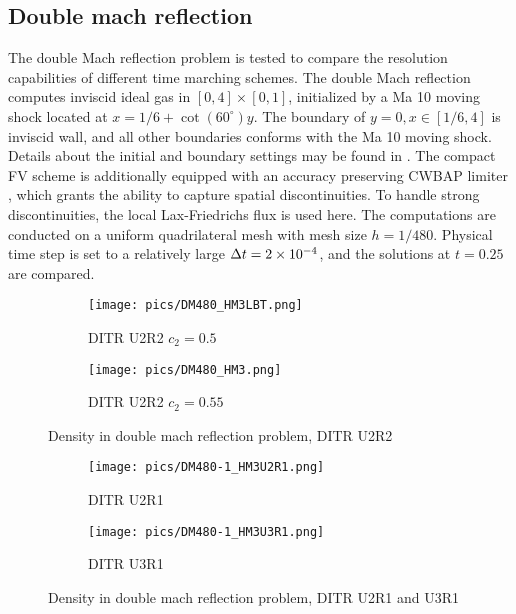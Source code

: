 \documentclass[preprint,12pt]{elsarticle}
\begin{document}
\subsection{Double mach reflection}

The double Mach reflection problem \cite{woodward1984dmr} is tested to
compare the resolution capabilities
of different time marching schemes.
The double Mach reflection computes
inviscid ideal gas in $[0,4]\times[0,1]$,
initialized by a Ma 10 moving shock located
at $x = 1/6 + \cot(60^\circ) y$.
The boundary of $y=0, x\in[1/6,4]$ is
inviscid wall, and all other boundaries
conforms with the Ma 10 moving shock.
Details about the initial and boundary settings may be found in \cite{woodward1984dmr}.
The compact FV scheme is additionally equipped with
an accuracy preserving CWBAP limiter \cite{wu2023cwbap},
which grants the ability to capture spatial  discontinuities.
To handle strong discontinuities, the local Lax-Friedrichs flux
is used here.
The computations are conducted on a uniform quadrilateral mesh with
mesh size $h=1/480$.
Physical time step is set to a relatively large $\mathrm\Delta t= 2\times10^{-4}$,
and the solutions at $t=0.25$ are compared.

\begin{figure}[htbp]
    \centering
    \begin{subfigure}{0.5\textwidth}
        \texttt{[image: pics/DM480\_HM3LBT.png]}
        \caption[]{DITR U2R2 $c_2=0.5$}
        \label{sfig:DM480_HM3LBT}
    \end{subfigure}\hfill
    \begin{subfigure}{0.5\textwidth}
        \texttt{[image: pics/DM480\_HM3.png]}
        \caption[]{DITR U2R2 $c_2=0.55$}
        \label{sfig:DM480_HM3}
    \end{subfigure}
    \caption{Density in double mach reflection problem, DITR U2R2}
    \label{fig:DM480-1}
\end{figure}

\begin{figure}[htbp]
    \centering
    \begin{subfigure}{0.5\textwidth}
        \texttt{[image: pics/DM480-1\_HM3U2R1.png]}
        \caption[]{DITR U2R1}
        \label{sfig:DM480_HM3U2R1}
    \end{subfigure}\hfill
    \begin{subfigure}{0.5\textwidth}
        \texttt{[image: pics/DM480-1\_HM3U3R1.png]}
        \caption[]{DITR U3R1}
        \label{sfig:DM480_HM3U3R1}
    \end{subfigure}
    \caption{Density in double mach reflection problem, DITR U2R1 and U3R1}
    \label{fig:DM480-2}
\end{figure}
\end{document}
